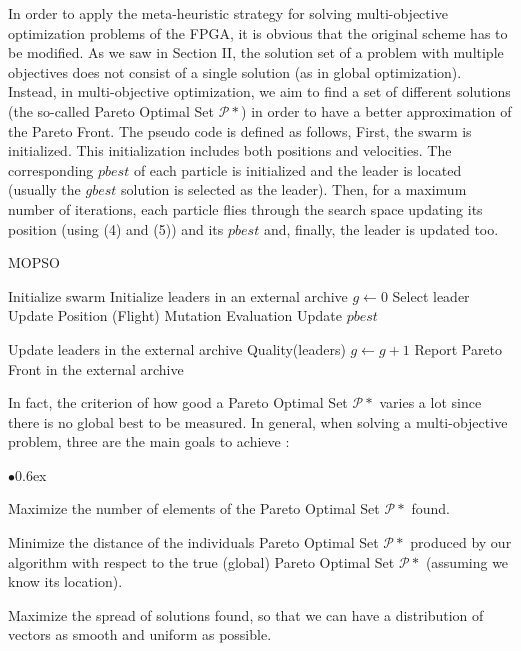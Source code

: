 \documentclass[11pt, runningheads,a4paper]{llncs}
\begin{document}
In order to apply the meta-heuristic strategy for solving multi-objective optimization problems of the FPGA, it is obvious that the original scheme has to be modified. As we saw in Section II, the solution set of a problem with multiple objectives does not consist of a single solution (as in global optimization). Instead, in multi-objective optimization, we aim to find a set of different solutions (the so-called Pareto Optimal Set $\mathcal{P}*$) in order to have a better approximation of the Pareto Front. 
The pseudo code is defined as follows, First, the swarm is initialized. This initialization includes both positions and velocities. The corresponding $pbest$ of each particle is initialized and the leader is located (usually the $gbest$ solution is selected as the leader). Then, for a maximum number of iterations, each particle flies through the search space updating its position (using (4) and (5)) and its $pbest$ and, finally, the leader is updated too.
\begin{algorithm}
\footnotesize

\caption{MOPSO}\label{ourmlo}
\begin{algorithmic}[1]
	\State Initialize swarm
	\State Initialize leaders in an external archive
	\State $g \gets 0$
		\State Select leader
		\State Update Position (Flight)
		\State Mutation
		\State Evaluation
		\State Update $pbest$

	   \EndFor
		\State Update leaders in the external archive
		\State Quality(leaders)
		\State $g \gets g+1$
	\EndWhile
	\State Report Pareto Front in the external archive
\end{algorithmic}
\end{algorithm}

In fact, the criterion of how good a Pareto Optimal Set $\mathcal{P}*$ varies a lot since there is no global best to be measured. In general, when solving a multi-objective problem, three are the main goals to achieve \cite{mocompare}:

\begin{list}{$\bullet$}{\itemsep 0.6ex}

\item Maximize the number of elements of the Pareto Optimal Set $\mathcal{P}*$ found.
\item Minimize the distance of the individuals Pareto Optimal Set $\mathcal{P}*$ produced by our algorithm with respect to the true (global) Pareto Optimal Set $\mathcal{P}*$ (assuming we know its location).
\item Maximize the spread of solutions found, so that we can have a distribution of vectors as smooth and uniform as possible.


\end{list}
\end{document}

